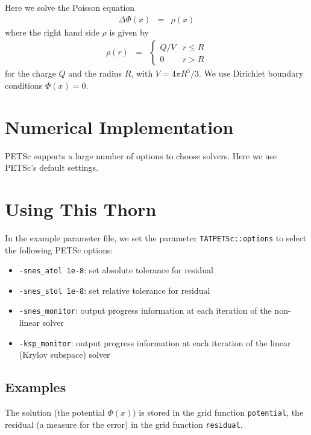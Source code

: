 Here we solve the Poisson equation
\begin{eqnarray}
  \Delta\Phi(x) &=& \rho(x)
\end{eqnarray}
where the right hand side $\rho$ is given by
\begin{eqnarray}
  \rho(r) & = & \left\{
  \begin{array}{ll}
    Q/V & r\le R \\
    0 & r>R
  \end{array}
  \right.
\end{eqnarray}
for the charge $Q$ and the radius $R$, with $V=4\pi R^3/3$. We use
Dirichlet boundary conditions $\Phi(x)=0$.

\section{Numerical Implementation}

PETSc supports a large number of options to choose solvers. Here we
use PETSc's default settings.

\section{Using This Thorn}

In the example parameter file, we set the parameter
\texttt{TATPETSc::options} to select the following PETSc options:
\begin{itemize}
\item \verb+-snes_atol 1e-8+: set absolute tolerance for residual
\item \verb+-snes_stol 1e-8+: set relative tolerance for residual
\item \verb+-snes_monitor+: output progress information at each
  iteration of the non-linear solver
\item \verb+-ksp_monitor+: output progress information at each
  iteration of the linear (Krylov subspace) solver
\end{itemize}

\subsection{Examples}

The solution (the potential $\Phi(x)$) is stored in the grid function
\texttt{potential}, the residual (a measure for the error) in the grid
function \texttt{residual}.




